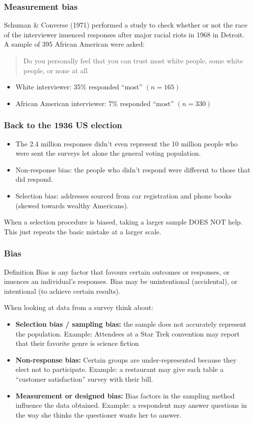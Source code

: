 \documentclass[a4paper]{article}\usepackage[]{graphicx}\usepackage[]{xcolor}
\begin{document}
\subsubsection{Measurement bias}
Schuman \& Converse (1971) performed a study to check whether or not the race of the interviewer inuenced responses after major racial riots in 1968 in Detroit. A sample of 395 African American were asked:
\begin{tcolorbox}[bluestyleline]
	\blockquote{Do you personally feel that you can trust most white people, some white people, or none at all}
\end{tcolorbox}
\begin{itemize}
    \item White interviewer: 35\% responded ``most'' \( (n=165) \)
    \item African American interviewer: 7\% responded ``most'' \( (n=330) \)
\end{itemize}
\subsubsection{Back to the 1936 US election}
\begin{itemize}
	\item The 2.4 million responses didn't even represent the 10 million people who were sent the surveys let alone the general voting population.
	\item Non-response bias: the people who didn't respond were different to those that did respond.
	\item Selection bias: addresses sourced from car registration and phone books (skewed towards wealthy Americans).
\end{itemize}
\begin{goldbox}
	When a selection procedure is biased, taking a larger sample DOES NOT help. This just repeats the basic mistake at a larger scale.
\end{goldbox}
\subsubsection{Bias}
\begin{bluebox}{Definition}
	Bias is any factor that favours certain outcomes or responses, or inuences an individual's responses. Bias may be unintentional (accidental), or intentional (to achieve certain results).
\end{bluebox}
When looking at data from a survey think about:
\begin{itemize}
	\item \textbf{Selection bias / sampling bias:} the sample does not accurately represent the population. Example: Attendees at a Star Trek convention may report that their favorite genre is science fiction
	\item \textbf{Non-response bias:} Certain groups are under-represented because they elect not to participate. Example: a restaurant may give each table a ``customer satisfaction'' survey with their bill.
	\item \textbf{Measurement or designed bias:} Bias factors in the sampling method influence the data obtained. Example: a respondent may answer questions in the way she thinks the questioner wants her to answer.		
\end{itemize}
\end{document}
